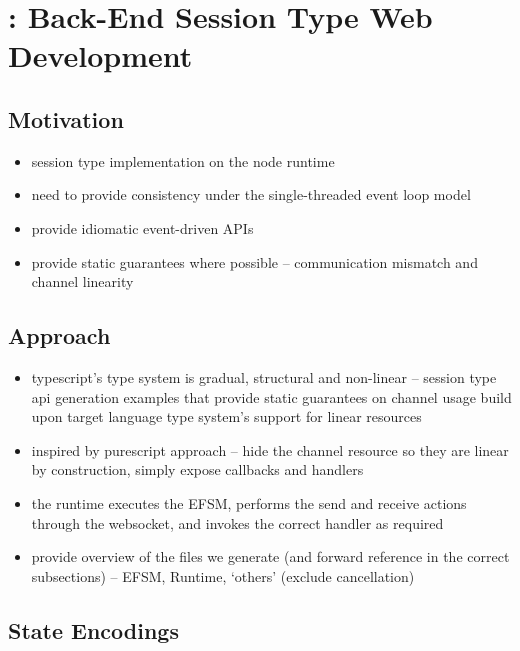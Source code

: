 \chapter{: Back-End Session Type Web Development}

\section{Motivation}
\begin{itemize}
\item session type implementation on the node runtime
\item need to provide consistency under the single-threaded event loop model
\item provide idiomatic event-driven APIs
\item provide static guarantees where possible -- communication mismatch and channel linearity
\end{itemize}

\section{Approach}
\begin{itemize}
\item typescript's type system is gradual, structural and non-linear -- session type api generation examples that provide static guarantees on channel usage build upon target language type system's support for linear resources
\item inspired by purescript approach -- hide the channel resource so they are linear by construction, simply expose callbacks and handlers
\item the runtime executes the EFSM, performs the send and receive actions through the websocket, and invokes the correct handler as required
\item provide overview of the files we generate (and forward reference in the correct subsections) -- EFSM, Runtime, `others' (exclude cancellation)
\end{itemize}

\section{State Encodings}

